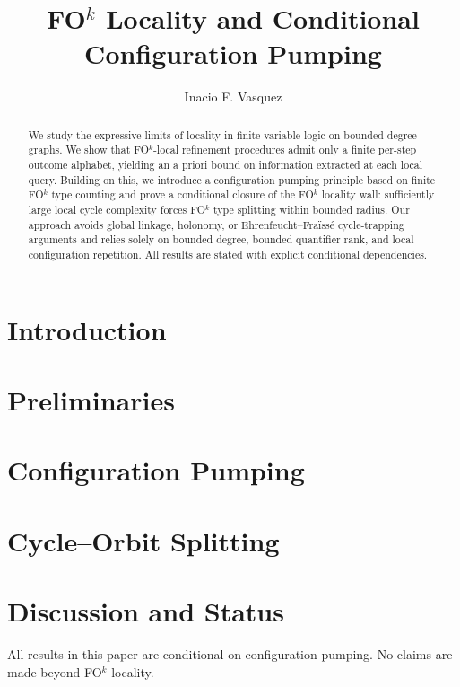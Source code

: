 \documentclass[11pt]{article}
\title{FO$^k$ Locality and Conditional Configuration Pumping}
\author{Inacio F. Vasquez}
\date{}
\begin{document}
\maketitle

\begin{abstract}
We study the expressive limits of locality in finite-variable logic on
bounded-degree graphs. We show that FO$^k$-local refinement procedures admit
only a finite per-step outcome alphabet, yielding an a priori bound on
information extracted at each local query. Building on this, we introduce a
configuration pumping principle based on finite FO$^k$ type counting and prove
a conditional closure of the FO$^k$ locality wall: sufficiently large local
cycle complexity forces FO$^k$ type splitting within bounded radius. Our
approach avoids global linkage, holonomy, or Ehrenfeucht--Fraïssé cycle-trapping
arguments and relies solely on bounded degree, bounded quantifier rank, and
local configuration repetition. All results are stated with explicit
conditional dependencies.
\end{abstract}

\section{Introduction}

\section{Preliminaries}

\section{Configuration Pumping}


\section{Cycle--Orbit Splitting}


\section{Discussion and Status}
All results in this paper are conditional on configuration pumping.
No claims are made beyond FO$^k$ locality.
\end{document}
